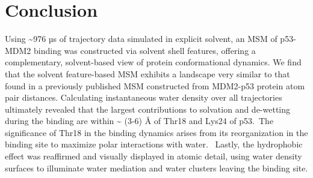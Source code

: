 
\section{Conclusion}

Using \textasciitilde{}976 µs of trajectory data simulated in explicit
solvent, an MSM of p53-MDM2 binding was constructed via solvent shell
features, offering a complementary, solvent-based view of protein
conformational dynamics. We find that the solvent feature-based MSM
exhibits a landscape very similar to that found in a previously
published MSM constructed from MDM2-p53 protein atom pair distances.
Calculating instantaneous water density over all trajectories ultimately
revealed that the largest contributions to solvation and de-wetting
during the binding are within \textasciitilde{} (3-6) Å of Thr18 and
Lys24 of p53.~The significance of Thr18 in the binding dynamics arises
from its reorganization in the binding site to maximize polar
interactions with water.~ Lastly, the hydrophobic effect was reaffirmed
and visually displayed in atomic detail, using water density surfaces to
illuminate water mediation and water clusters leaving the binding site.


